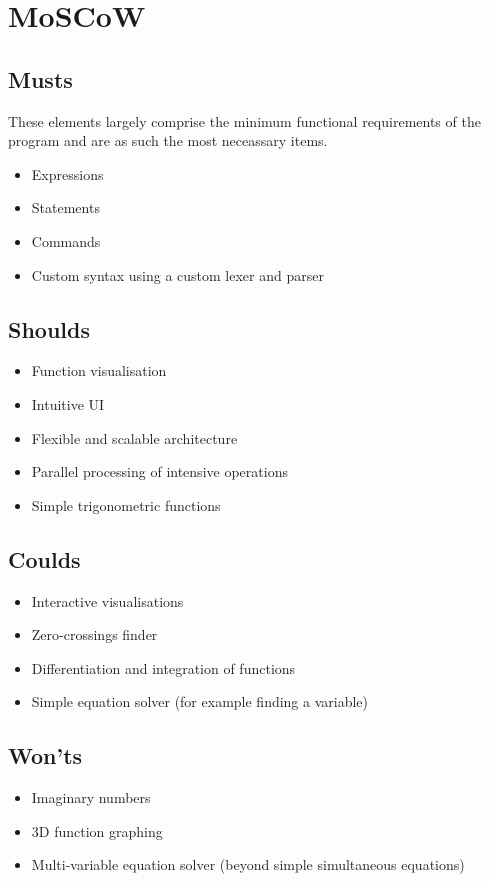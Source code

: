 \documentclass[a4paper, oneside, 11pt]{report}
\begin{document}
\section{MoSCoW}
\subsection{Musts}

These elements largely comprise the minimum functional requirements of the program and are as such the most neceassary items.
\begin{itemize}
	\item Expressions
	\item Statements
	\item Commands
	\item Custom syntax using a custom lexer and parser
\end{itemize}

\subsection{Shoulds}

\begin{itemize}
	\item Function visualisation
	\item Intuitive UI
	\item Flexible and scalable architecture
	\item Parallel processing of intensive operations
	\item Simple trigonometric functions
\end{itemize}

\subsection{Coulds}
\begin{itemize}
	\item Interactive visualisations
	\item Zero-crossings finder
	\item Differentiation and integration of functions
	\item Simple equation solver (for example finding a variable)
\end{itemize}

\subsection{Won'ts}
\begin{itemize}
	\item Imaginary numbers
	\item 3D function graphing
	\item Multi-variable equation solver (beyond simple simultaneous equations)
\end{itemize}
\end{document}
